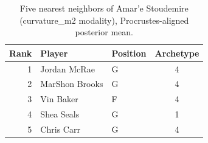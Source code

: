 \begin{table}[htbp]
  \centering\small
  \begin{tabular}{rllc}
    \toprule
    Rank & Player & Position & Archetype \\
    \midrule
    1 & Jordan McRae & G & 4 \\
    2 & MarShon Brooks & G & 4 \\
    3 & Vin Baker & F & 4 \\
    4 & Shea Seals & G & 1 \\
    5 & Chris Carr & G & 4 \\
    \bottomrule
  \end{tabular}
  \caption{Five nearest neighbors of Amar'e Stoudemire (curvature_m2 modality), Procrustes-aligned posterior mean.}
  \label{tab:Amar_e_Stoudemire_neighbors_curvature_m2}
\end{table}


